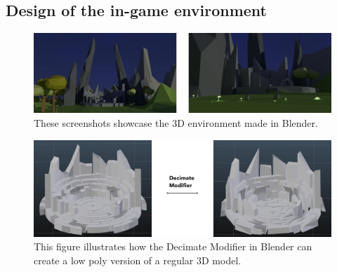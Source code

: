\subsection{Design of the in-game environment}
\begin{figure}[tbph]
    \centering
    \includegraphics[width=1.0\textwidth]{images/Forest}
    \caption[The forest scene from the prototype]{These screenshots showcase the 3D environment made in Blender.}
    \label{fig:Forest}
\end{figure}

\begin{figure}[tbph]
    \centering
    \includegraphics[width=1.0\textwidth]{images/lowPolyDecimate}
    \caption[Example use of the Decimate Modifier in Blender]{This figure illustrates how the Decimate Modifier in Blender can create a low poly version of a regular 3D model.}
    \label{fig:lowpolydecimate}
\end{figure}



